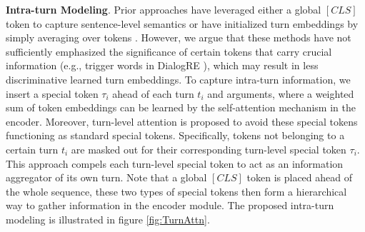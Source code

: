 \textbf{Intra-turn Modeling}. Prior approaches have leveraged either a global $[CLS]$ token to capture sentence-level semantics \citep{bertbase} or have initialized turn embeddings by simply averaging over tokens \citep{lee2021graph}. However, we argue that these methods have not sufficiently emphasized the significance of certain tokens that carry crucial information (e.g., trigger words in DialogRE \citep{yu-etal-2020-dialogue}), which may result in less discriminative learned turn embeddings. To capture intra-turn information, we insert a special token $\tau_i$ ahead of each turn $t_i$ and arguments, where a weighted sum of token embeddings can be learned by the self-attention mechanism in the encoder. Moreover, turn-level attention is proposed to avoid these special tokens functioning as standard special tokens. Specifically, tokens not belonging to a certain turn $t_i$ are masked out for their corresponding turn-level special token $\tau_i$. This approach compels each turn-level special token to act as an information aggregator of its own turn. Note that a global $[CLS]$ token is placed ahead of the whole sequence, these two types of special tokens then form a hierarchical way to gather information in the encoder module. The proposed intra-turn modeling is illustrated in figure \ref{fig:TurnAttn}.




%


